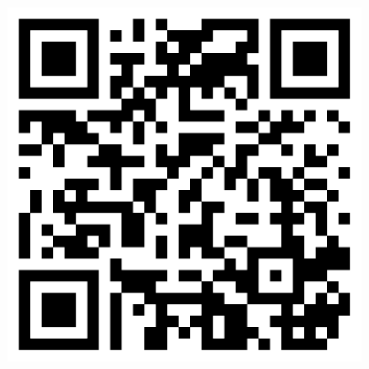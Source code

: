\documentclass[final]{beamer}
\begin{document}
\begin{frame}[fragile]
\begin{columns}[t]
\begin{rightcolumn}
\begin{footnotesize}
\begin{minipage}[t]{0.12\textwidth}
\begin{figure}
         \includegraphics[width=\textwidth]{qrcode} \\
      \end{figure}
   \end{minipage}
   \end{footnotesize}
\end{rightcolumn}

\end{columns}
\end{frame}
\end{document}
